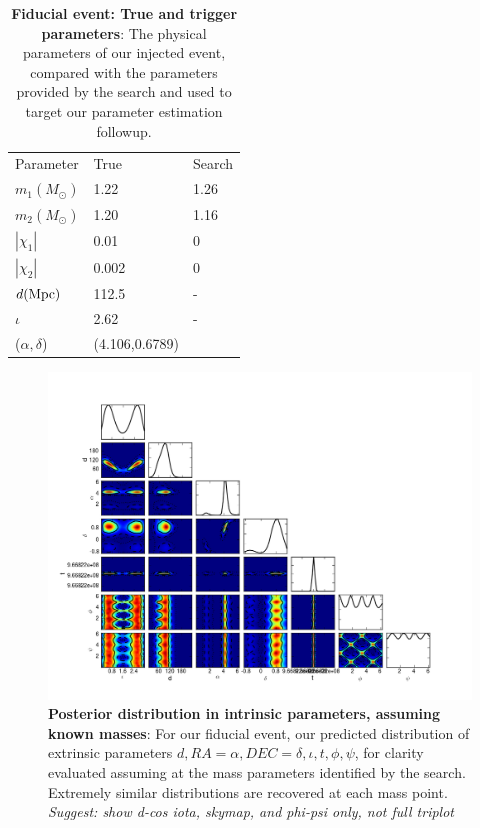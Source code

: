 \documentclass[twocolumn,prd,nofootinbib]{revtex4}
\newcommand\unit[1]{{\rm #1}}
\begin{document}
\begin{table}
\begin{tabular}{l|ll}
Parameter & True & Search \\
$m_1 (M_\odot)$ &  1.22 & 1.26 \\
$m_2 (M_\odot)$ &  1.20 & 1.16 \\
$|\chi_1| $ & 0.01  & 0 \\
$|\chi_2| $ & 0.002 & 0 \\
$d (\unit{Mpc}) $ & 112.5 & - \\
$\iota $ & 2.62 & - \\
($\alpha,\delta$) & (4.106,0.6789) &\\
\end{tabular}
\caption{\label{tab:FiducialEvent:Parameters}\textbf{Fiducial event: True and trigger parameters}: The physical parameters of our injected event, compared
  with the parameters provided by the search and used to target our parameter estimation followup.
}
\end{table}




\begin{figure}
\includegraphics[width=\textwidth]{../Figures/v2runs_coinc_id_833_ILE_triplot_MASS_SET_0}
\caption{\label{fig:FiducialEvent:Triplot:TriggerMasses}\textbf{Posterior distribution in intrinsic parameters, assuming known masses}: For our fiducial event, our predicted
  distribution of extrinsic parameters $d,RA=\alpha,DEC=\delta,\iota,t,\phi,\psi$, for clarity evaluated assuming at the
  mass parameters identified by the search.  Extremely similar distributions are recovered at each mass point.   \emph{Suggest: show d-cos iota, skymap, and phi-psi only, not full triplot}
}
\end{figure}
\end{document}
